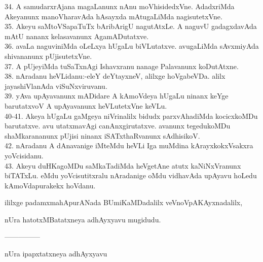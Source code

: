 \documentclass{article}
\begin{document}
34. A samudarxrAjana magaLanunx nAnu moVhisidedxVne. AdadxriMda Akeyanunx manoVharavAda hAsayxda mAtugaLiMda nagisutetxVne.\\
35. Akeyu saMtoVSapaTuTx bAribArigU nagutAtxLe. A naguvU gadagxdavAda mAtU nananx kelasavanunx AgamADutatxve.\\
36. avaLa naguviniMda oLeLxya hUgaLu biVLutatxve. avugaLiMda sAvxmiyAda shivananunx pUjisutetxVne.\\
37. A pUjeyiMda tuSaTxnAgi Ishavxranu nanage Palavanunx koDutAtxne.\\
38. nAradanu heVLidanu:-eleY deYtayxneV, alilxge hoVgabeVDa. alilx jayashiVlanAda viSuNxviruvanu.\\
39. yAva upAyavanunx mADidare A kAmoVdeya hUgaLu ninanx keYge barutatxvoV A upAyavanunx heVLutetxVne keVLu.\\
40-41. Akeya hUgaLu gaMgeya niVrinalilx bidudx parxvAhadiMda kocicxkoMDu barutatxve. avu utatxmavAgi canAnxgirutatxve. avanunx tegedukoMDu shaMkarananunx pUjisi ninanx iSATxthaRvanunx sAdhisikoV.\\
42. nAradanu A dAnavanige iMteMdu heVLi Iga muMdina kArayxkokxVsakxra yoVcisidanu.\\
43. Akeyu duHKagoMDu saMkaTadiMda heVgetAne atutx kaNiNxVranunx biTATxLu. eMdu yoVcisutitxralu nAradanige oMdu vidhavAda upAyavu hoLedu kAmoVdapurakekx hoVdanu.

\begin{center}
ililxge padamxmahApurANada BUmiKaMDadalilx veVnoVpAKAyxnadalilx,
\end{center}

\begin{center}
nUra hatotxMBatatxneya adhAyxyavu mugidudu.
\end{center}

\begin{center}
---------------
\end{center}

\begin{center}
nUra ipapxtatxneya adhAyxyavu
\end{center}
\end{document}
